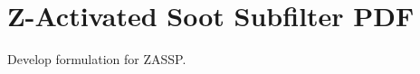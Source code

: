 \section{Z-Activated Soot Subfilter PDF}
\label{sec:subfilter:zassp}

Develop formulation for ZASSP.
